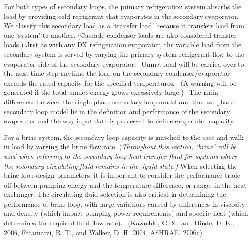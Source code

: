 For both types of secondary loops, the primary refrigeration system absorbs the load by providing cold refrigerant that evaporates in the secondary evaporator.~ We classify this secondary load as a `transfer load' because it transfers load from one `system' to another. (Cascade condenser loads are also considered transfer loads.) Just as with any DX refrigeration evaporator, the variable load from the secondary system is served by varying the primary system refrigerant flow to the evaporator side of the secondary evaporator.~ Unmet load will be carried over to the next time step anytime the load on the secondary condenser/evaporator exceeds the rated capacity for the specified temperatures.~ (A warning will be generated if the total unmet energy grows excessively large.) ~The main differences between the single-phase secondary loop model and the two-phase secondary loop model lie in the definition and performance of the secondary evaporator and the way input data is processed to define evaporator capacity.

For a brine system, the secondary loop capacity is matched to the case and walk-in load by varying the brine flow rate. (\emph{Throughout this section, `brine' will be used when referring to the secondary loop heat transfer fluid for systems where the secondary circulating fluid remains in the liquid state.)} When selecting the brine loop design parameters, it is important to consider the performance trade-off between pumping energy and the temperature difference, or range, in the heat exchanger. The circulating fluid selection is also critical in determining the performance of brine loop, with large variations caused by differences in viscosity and density (which impact pumping power requirements) and specific heat (which determines the required fluid flow rate). ~(Kazachki, G. S., and Hinde, D. K., 2006, Faramarzi, R. T., and Walker, D. H. 2004, ASHRAE. 2006c)

